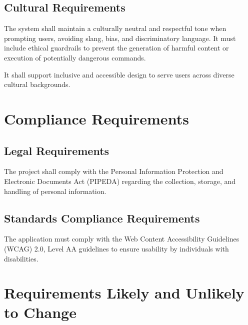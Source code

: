 \documentclass[11pt]{article}
\begin{document}
\subsection{Cultural Requirements}
The system shall maintain a culturally neutral and respectful tone when prompting users, avoiding slang, bias, and discriminatory language. It must include ethical guardrails to prevent the generation of harmful content or execution of potentially dangerous commands.

It shall support inclusive and accessible design to serve users across diverse cultural backgrounds.

\section{Compliance Requirements}
\subsection{Legal Requirements}
The project shall comply with the Personal Information Protection and Electronic Documents Act (PIPEDA) regarding the collection, storage, and handling of personal information.

\subsection{Standards Compliance Requirements}
The application must comply with the Web Content Accessibility Guidelines (WCAG) 2.0, Level AA guidelines to ensure usability by individuals with disabilities.

\section{Requirements Likely and Unlikely to Change}
\end{document}
